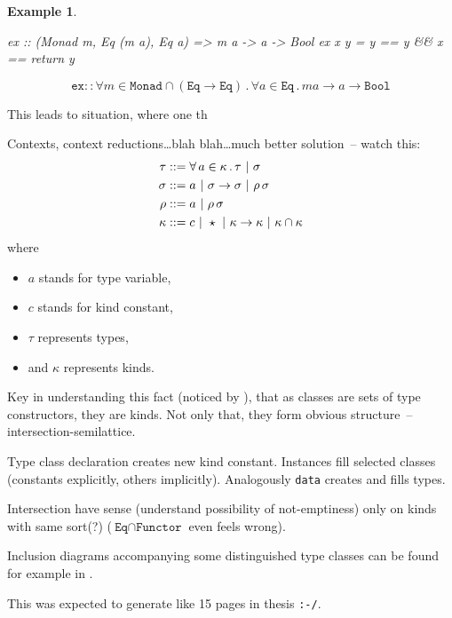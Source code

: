 \documentclass[11pt,oneside,draft]{fithesis2}
\newtheorem{example}{Example}
\begin{document}
\begin{example}~
\begin{code}
ex :: (Monad m, Eq (m a), Eq a) => m a -> a -> Bool
ex x y = y == y && x == return y
\end{code}
\[ \texttt{ex} :: \forall m \in \texttt{Monad} \cap (\texttt{Eq} \to \texttt{Eq}) \, . \, \forall a \in \texttt{Eq} \, . \, m a \to a \to \texttt{Bool} \]
\end{example}

This leads to situation, where one th

Contexts, context reductions\dots blah blah\dots much better solution~-- watch this:
\begin{align*}
	\tau   & ::= \forall \, a \in \kappa \, . \, \tau ~|~ \sigma \\
	\sigma & ::= a ~|~ \sigma \to \sigma ~|~ \rho \, \sigma \\
	\rho   & ::= a ~|~ \rho \, \sigma \\
	\kappa & ::= c ~|~ \star ~|~ \kappa \to \kappa ~|~ \kappa \cap \kappa \\
\end{align*}
where
\begin{itemize}
	\item \(a\) stands for type variable,
	\item \(c\) stands for kind constant,
	\item \(\tau\) represents types,
	\item and \(\kappa\) represents kinds.
\end{itemize}

Key in understanding this fact (noticed by \cite{libor}),
that as classes are sets of type constructors, they are kinds.
Not only that, they form obvious structure~-- intersection-semilattice.

Type class declaration creates new kind constant.
Instances fill selected classes (constants explicitly, others implicitly).
Analogously \texttt{data} creates and fills types.

Intersection have sense (understand possibility of not-emptiness) only on
kinds with same sort(?) (\(\texttt{Eq} \cap \texttt{Functor}\) even feels wrong).

Inclusion diagrams accompanying some distinguished type classes can be found for
example in \cite{typeclassopedia}.

This was expected to generate like 15 pages in thesis \verb~:-/~.
\end{document}
